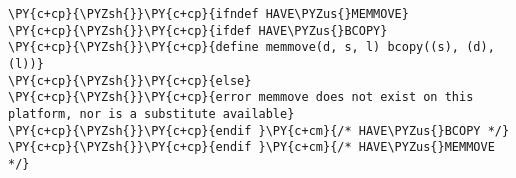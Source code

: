 \begin{Verbatim}[commandchars=\\\{\}]
\PY{c+cp}{\PYZsh{}}\PY{c+cp}{ifndef HAVE\PYZus{}MEMMOVE}
\PY{c+cp}{\PYZsh{}}\PY{c+cp}{ifdef HAVE\PYZus{}BCOPY}
\PY{c+cp}{\PYZsh{}}\PY{c+cp}{define memmove(d, s, l) bcopy((s), (d), (l))}
\PY{c+cp}{\PYZsh{}}\PY{c+cp}{else}
\PY{c+cp}{\PYZsh{}}\PY{c+cp}{error memmove does not exist on this platform, nor is a substitute available}
\PY{c+cp}{\PYZsh{}}\PY{c+cp}{endif }\PY{c+cm}{/* HAVE\PYZus{}BCOPY */}
\PY{c+cp}{\PYZsh{}}\PY{c+cp}{endif }\PY{c+cm}{/* HAVE\PYZus{}MEMMOVE */}
\end{Verbatim}
